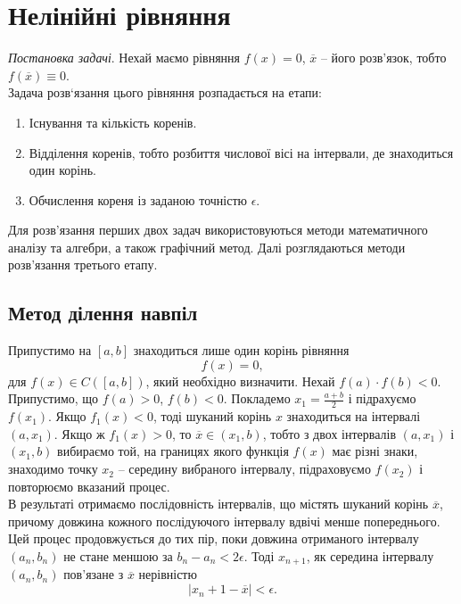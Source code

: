 \section{Нелінійні рівняння}

\textit{Постановка задачі}. Нехай маємо рівняння $f(x) = 0$, $\overline{x}$ -- його розв’язок, тобто $f (\overline{x}) \equiv 0$. \\

Задача розв‘язання цього рівняння розпадається на етапи:
\begin{enumerate}
	\item Існування та кількість коренів.
	\item Відділення коренів, тобто розбиття числової вісі на інтервали, де знаходиться один корінь.
	\item Обчислення кореня із заданою точністю $\epsilon$.
\end{enumerate}

Для розв'язання перших двох задач використовуються методи математичного аналізу та алгебри, а також графічний метод. Далі розглядаються методи розв'язання третього етапу.

\subsection{Метод ділення навпіл}

Припустимо на $[a, b]$ знаходиться лише один корінь рівняння 
\begin{equation}
	\label{eq:2.1}
	f(x) = 0,
\end{equation}
для $f(x) \in C([a,b])$, який необхідно визначити. Нехай $f(a) \cdot f (b) < 0$. \\

Припустимо, що $f(a) > 0$, $f(b) < 0$. Покладемо $x_1 = \frac{a + b}{2}$ і підрахуємо
$f(x_1)$. Якщо $f_1(x) < 0$, тоді шуканий корінь $x$ знаходиться на інтервалі $(a, x_1)$. Якщо ж $f_1(x) > 0$, то $\overline{x} \in (x_1, b)$, тобто з двох інтервалів $(a, x_1)$ і $(x_1, b)$ вибираємо той, на границях якого функція $f(x)$ має різні знаки, знаходимо точку $x_2$ -- середину вибраного інтервалу, підраховуємо $f(x_2)$ і повторюємо вказаний процес. \\

В результаті отримаємо послідовність інтервалів, що містять шуканий корінь $\overline{x}$, причому довжина кожного послідуючого інтервалу вдвічі менше попереднього. \\

Цей процес продовжується до тих пір, поки довжина отриманого інтервалу $(a_n, b_n)$ не стане меншою за $b_n - a_n < 2 \epsilon$. Тоді $x_{n+1}$, як середина інтервалу $(a_n, b_n)$ пов'язане з $\overline{x}$ нерівністю
\begin{equation}
	\label{eq:2.2}
	|x_n+1 - \overline{x}| < \epsilon.
\end{equation}

